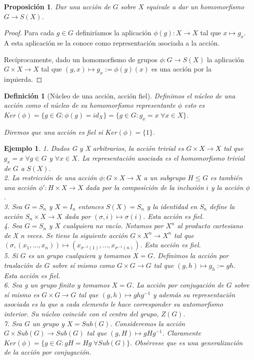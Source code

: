 \documentclass{article}
\theoremstyle{theorem-style}  %
\newtheorem{proposition}[theorem]{Proposición}
\theoremstyle{definition-style}
\newtheorem{definition}{Definición}[section]
\theoremstyle{example-style}
\newtheorem{example}{Ejemplo}[section]
\begin{document}
\begin{proposition}
Dar una acción de $G$ sobre $X$ equivale a dar un homomorfismo $G \rightarrow S(X)$.
\end{proposition}
\begin{proof}
Para cada $g \in G$ definiríamos la aplicación $\phi(g):X \rightarrow X$ tal que $x \mapsto g_x$. A esta aplicación se la conoce como representación asociada a la acción.

Recíprocamente, dado un homomorfismo de grupos $\phi:G \rightarrow S(X)$ la aplicación $G \times X \rightarrow X$ tal que $(g,x) \mapsto g_x:= \phi(g)(x)$ es una acción por la izquierda.
\end{proof}

\begin{definition}[Núcleo de una acción, acción fiel]
Definimos el núcleo de una acción como el núcleo de su homomorfismo representante $\phi$ esto es $Ker(\phi) = \{g \in G: \phi(g) = id_X\} = \{g \in G:g_x = x \; \forall x \in X\}$.

Diremos que una acción es fiel si $Ker(\phi) = \{1\}$.
\end{definition}

\begin{example}
1. Dados G y X arbitrarios, la acción trivial es $G \times X \rightarrow X$ tal que $g_x = x \; \forall g \in G$ y $\forall x \in X$. La representación asociada es el homomorfismo trivial de $G$ a $S(X)$.\\
2. La restricción de una acción $\phi:G \times X \rightarrow X$ a un subgrupo $H \le G$ es también una acción $\phi':H \times X \rightarrow X$ dada por la composición de la inclusión $i$ y la acción $\phi$.\\
3. Sea $G = S_n$ y $X = I_n$ entonces $S(X) = S_n$ y la identidad en $S_n$ define la acción $S_n \times X \rightarrow X$ dada por $(\sigma,i) \mapsto \sigma(i)$. Esta acción es fiel.\\
4. Sea $G=S_n$ y $X$ cualquiera no vacío. Notamos por $X^n$ al producto cartesiano de X n veces. Se tiene la siguiente acción $G \times X^n \rightarrow X^n$ tal que $(\sigma,(x_1,...,x_n)) \mapsto (x_{\sigma^{-1}(1)},...,x_{\sigma^{-1}(n)})$. Esta acción es fiel.\\
5. Si $G$ es un grupo cualquiera y tomamos $X=G$. Definimos la acción por traslación de $G$ sobre sí mismo como $G \times G \rightarrow G$ tal que $(g,h) \mapsto g_h:=gh$. Esta acción es fiel.\\
6. Sea g un grupo finito y tomamos $X=G$. La acción por conjugación de $G$ sobre sí mismo es $G \times G \rightarrow G$ tal que $(g,h) \mapsto ghg^{-1}$ y además su representación asociada es la que a cada elemento le hace corresponder su automorfismo interior. Su núcleo coincide con el centro del grupo, $Z(G)$.\\
7. Sea $G$ un grupo y $X = Sub(G)$. Consideremos la acción $G \times Sub(G) \rightarrow Sub(G)$ tal que $(g,H) \mapsto gHg^{-1}$. Claramente $Ker(\phi) = \{g \in G:gH = Hg \; \forall Sub(G)\}$. Obsérvese que es una generalización de la acción por conjugación.
\end{example}
\end{document}
